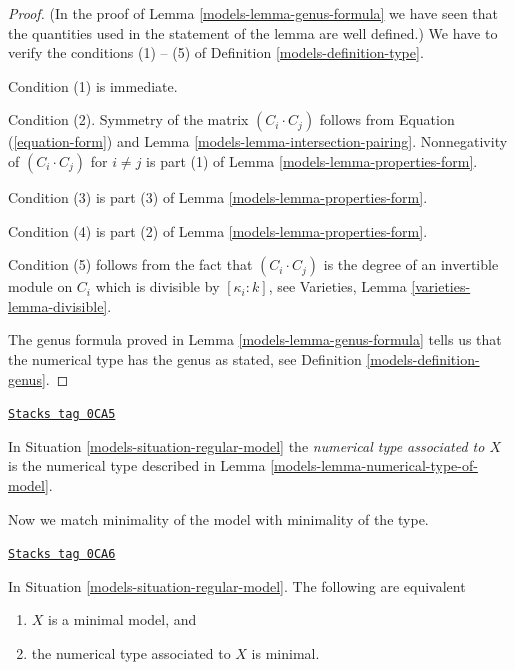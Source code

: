 \begin{proof}

(In the proof of Lemma \ref{models-lemma-genus-formula}
we have seen that the quantities
used in the statement of the lemma are well defined.)
We have to verify the conditions (1) -- (5) of
Definition \ref{models-definition-type}.

\medskip\noindent
Condition (1) is immediate.

\medskip\noindent
Condition (2). Symmetry of the matrix $(C_i \cdot C_j)$ follows from
Equation (\ref{equation-form}) and
Lemma \ref{models-lemma-intersection-pairing}.
Nonnegativity of $(C_i \cdot C_j)$ for $i \not = j$
is part (1) of Lemma \ref{models-lemma-properties-form}.

\medskip\noindent
Condition (3) is part (3) of Lemma \ref{models-lemma-properties-form}.

\medskip\noindent
Condition (4) is part (2) of Lemma \ref{models-lemma-properties-form}.

\medskip\noindent
Condition (5) follows from the fact that $(C_i \cdot C_j)$ is
the degree of an invertible module on $C_i$ which is divisible
by $[\kappa_i : k]$, see Varieties, Lemma \ref{varieties-lemma-divisible}.

\medskip\noindent
The genus formula proved in Lemma \ref{models-lemma-genus-formula}
tells us that the numerical type has the genus as stated, see
Definition \ref{models-definition-genus}.
\end{proof}

\begin{definition}
\label{models-definition-numerical-type-model}
\href{https://stacks.math.columbia.edu/tag/0CA5}{\texttt{Stacks tag 0CA5}}

In Situation \ref{models-situation-regular-model} the
{\it numerical type associated to $X$} is the numerical
type described in Lemma \ref{models-lemma-numerical-type-of-model}.
\end{definition}

Now we match minimality of the model with minimality of the type.

\begin{lemma}
\label{models-lemma-numerical-type-minimal-model}
\href{https://stacks.math.columbia.edu/tag/0CA6}{\texttt{Stacks tag 0CA6}}

In Situation \ref{models-situation-regular-model}. The following
are equivalent
\begin{enumerate}
\item $X$ is a minimal model, and
\item the numerical type associated to $X$ is minimal.
\end{enumerate}
\end{lemma}

